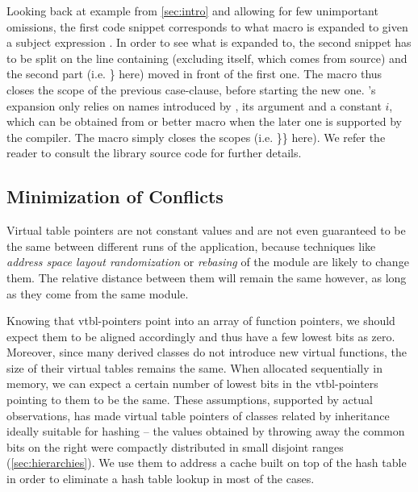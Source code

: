 
Looking back at example from \textsection\ref{sec:intro} and allowing for few 
unimportant omissions, the first code snippet corresponds to what macro 
 is expanded to given a subject expression . In order to 
see what  is expanded to, the second snippet has to be split on 
the line containing  (excluding  itself, which comes from 
source) and the second part (i.e. \} here) moved in front of the first one. The 
macro thus closes the scope of the previous case-clause, before starting the new 
one. 's expansion only relies on names introduced by , 
its argument  and a constant $i$, which can be obtained from 
 or better  macro when the later one is 
supported by the compiler. The  macro simply closes the scopes 
(i.e. \}\} here). We refer the reader to consult the library source code for 
further details.


\subsection{Minimization of Conflicts}
\label{sec:moc}

Virtual table pointers are not constant values and are not even guaranteed to be 
the same between different runs of the application, because techniques like 
\emph{address space layout randomization} or \emph{rebasing} of the module are 
likely to change them. The relative distance between them will remain the same 
however, as long as they come from the same module.

Knowing that vtbl-pointers point into an array of function pointers, we should 
expect them to be aligned accordingly and thus have a few lowest bits as zero. 
Moreover, since many derived classes do not introduce new virtual functions, 
the size of their virtual tables remains the same. When allocated sequentially 
in memory, we can expect a certain number of lowest bits in the vtbl-pointers 
pointing to them to be the same.
These assumptions, supported by actual observations, has made virtual table 
pointers of classes related by inheritance ideally suitable for hashing -- the 
values obtained by throwing away the common bits on the right were compactly 
distributed in small disjoint ranges (\textsection\ref{sec:hierarchies}). We use 
them to address a cache built on top of the hash table in order to eliminate a 
hash table lookup in most of the cases.

